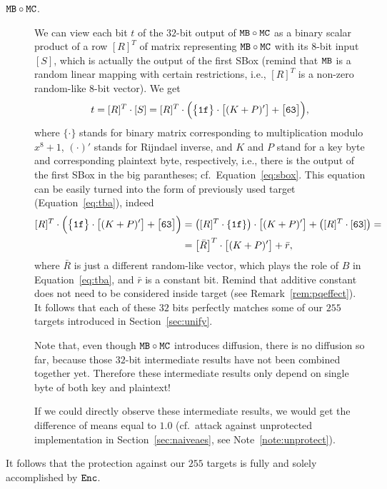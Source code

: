 \begin{description}
	\item[$\texttt{MB}\circ\texttt{MC}$.] We can view each bit $t$ of the $32$-bit output of $\texttt{MB}\circ\texttt{MC}$ as a binary scalar product of a row $[R]^T$ of matrix representing $\texttt{MB}\circ\texttt{MC}$ with its $8$-bit input $[S]$, which is actually the output of the first SBox (remind that $\texttt{MB}$ is a random linear mapping with certain restrictions, i.e., $[R]^T$ is a non-zero random-like $8$-bit vector). We get
	\begin{equation*}
		t = [R]^T\cdot [S] = [R]^T\cdot\Bigl( \bigl\{\texttt{1f}\bigr\}\cdot\bigl[(K+P)'\bigr] + \bigl[\texttt{63}\bigr] \Bigr) ,
	\end{equation*}
	where $\{\cdot\}$ stands for binary matrix corresponding to multiplication modulo $x^8+1$, $(\cdot)'$ stands for Rijndael inverse, and $K$ and $P$ stand for a key byte and corresponding plaintext byte, respectively, i.e., there is the output of the first SBox in the big parantheses; cf.\ Equation~\ref{eq:sbox}. This equation can be easily turned into the form of previously used target (Equation~\ref{eq:tba}), indeed
	\begin{align}
	\label{eq:mbmctarget}
		[R]^T\cdot\Bigl( \bigl\{\texttt{1f}\bigr\}\cdot\bigl[(K+P)'\bigr] + \bigl[\texttt{63}\bigr] \Bigr) &= \bigl([R]^T\cdot \{\texttt{1f}\}\bigr)\cdot\bigl[(K+P)'\bigr] + \bigl([R]^T\cdot [\texttt{63}]\bigr) = \nonumber \\
		&= \bigl[\bar R\bigr]^T \cdot \bigl[(K+P)'\bigr] + \bar r ,
	\end{align}
	where $\bar R$ is just a different random-like vector, which plays the role of $B$ in Equation~\ref{eq:tba}, and $\bar r$ is a constant bit. Remind that additive constant does not need to be considered inside target (see Remark~\ref{rem:pqeffect}). It follows that each of these $32$ bits perfectly matches some of our $255$ targets introduced in Section~\ref{sec:unify}.
	
	Note that, even though $\texttt{MB}\circ\texttt{MC}$ introduces diffusion, there is no diffusion so far, because those $32$-bit intermediate results have not been combined together yet. Therefore these intermediate results only depend on single byte of both key and plaintext!
	
	If we could directly observe these intermediate results, we would get the difference of means equal to $1.0$ (cf.\ attack against unprotected implementation in Section~\ref{sec:naiveaes}, see Note~\ref{note:unprotect}).
\end{description}
\begin{remark}
\label{rem:enc}
	It follows that the protection against our $255$ targets is fully and solely accomplished by $\texttt{Enc}$.
\end{remark}
